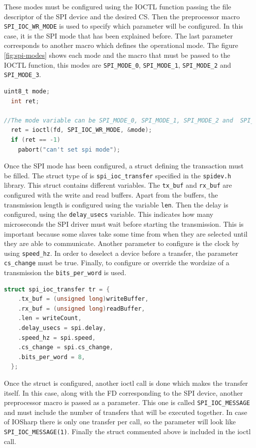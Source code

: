 These modes must be configured using the \gls{IOCTL} function passing the file descriptor of the SPI device and the desired \gls{CS}. Then the preprocessor macro \verb!SPI_IOC_WR_MODE! is used to specify which parameter will be configured. In this case, it is the SPI mode that has been explained before. The last parameter corresponds to another macro which defines the operational mode. The figure \ref{fig:spi-modes} shows each mode and the macro that must be passed to the \gls{IOCTL} function, this modes are \verb!SPI_MODE_0!, \verb!SPI_MODE_1!, \verb!SPI_MODE_2! and \verb!SPI_MODE_3!.

\begin{lstlisting}[language=C, caption={IOSharp.c - SPI Mode configuration}]
uint8_t mode;
  int ret;

//The mode variable can be SPI_MODE_0, SPI_MODE_1, SPI_MODE_2 and  SPI_MODE_3
  ret = ioctl(fd, SPI_IOC_WR_MODE, &mode);
  if (ret == -1)
    pabort("can't set spi mode");
\end{lstlisting}

Once the SPI mode has been configured, a struct defining the transaction must be filled. The struct type of is \verb!spi_ioc_transfer! specified in the \verb!spidev.h! library. This struct contains different variables. The \verb!tx_buf! and \verb!rx_buf! are configured with the write and read buffers. Apart from the buffers, the transmission length is configured using the variable \verb!len!. Then the delay is configured, using the \verb!delay_usecs! variable. This indicates how many microseconds the SPI driver must wait before starting the transmission. This is important because some slaves take some time from when they are selected until they are able to communicate. Another parameter to configure is the clock by using \verb!speed_hz!. In order to deselect a device before a transfer, the parameter \verb!cs_change! must be true. Finally, to configure or override the wordsize of a transmission the \verb!bits_per_word! is used.

\begin{lstlisting}[language=C, caption={IOSharp.c - SPI struct configuration}]
struct spi_ioc_transfer tr = {
    .tx_buf = (unsigned long)writeBuffer,
    .rx_buf = (unsigned long)readBuffer,
    .len = writeCount,
    .delay_usecs = spi.delay,
    .speed_hz = spi.speed,
    .cs_change = spi.cs_change,
    .bits_per_word = 8,
  };
\end{lstlisting}

Once the struct is configured, another ioctl call is done which makes the transfer itself. In this case, along with the \gls{FD} corresponding to the SPI device, another preprocessor macro is passed as a parameter. This one is called \verb!SPI_IOC_MESSAGE! and must include the number of transfers that will be executed together. In case of IOSharp there is only one transfer per call, so the parameter will look like \verb!SPI_IOC_MESSAGE(1)!. Finally the struct commented above is included in the ioctl call.

